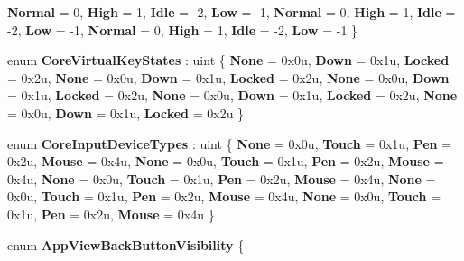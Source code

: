 \begin{DoxyCompactItemize}
\newline
{\bfseries Normal} = 0, 
{\bfseries High} = 1, 
{\bfseries Idle} = -\/2, 
{\bfseries Low} = -\/1, 
\newline
{\bfseries Normal} = 0, 
{\bfseries High} = 1, 
{\bfseries Idle} = -\/2, 
{\bfseries Low} = -\/1, 
\newline
{\bfseries Normal} = 0, 
{\bfseries High} = 1, 
{\bfseries Idle} = -\/2, 
{\bfseries Low} = -\/1
 \}
\item 
\mbox{\label{namespace_windows_1_1_u_i_1_1_core_aa71ac02d1eeaccb86184a016581721ab}} 
enum {\bfseries Core\+Virtual\+Key\+States} \+: uint \{ \newline
{\bfseries None} = 0x0u, 
{\bfseries Down} = 0x1u, 
{\bfseries Locked} = 0x2u, 
{\bfseries None} = 0x0u, 
\newline
{\bfseries Down} = 0x1u, 
{\bfseries Locked} = 0x2u, 
{\bfseries None} = 0x0u, 
{\bfseries Down} = 0x1u, 
\newline
{\bfseries Locked} = 0x2u, 
{\bfseries None} = 0x0u, 
{\bfseries Down} = 0x1u, 
{\bfseries Locked} = 0x2u, 
\newline
{\bfseries None} = 0x0u, 
{\bfseries Down} = 0x1u, 
{\bfseries Locked} = 0x2u
 \}
\item 
\mbox{\label{namespace_windows_1_1_u_i_1_1_core_a77ab8ebe40609e15ad86f2c13a357af6}} 
enum {\bfseries Core\+Input\+Device\+Types} \+: uint \{ \newline
{\bfseries None} = 0x0u, 
{\bfseries Touch} = 0x1u, 
{\bfseries Pen} = 0x2u, 
{\bfseries Mouse} = 0x4u, 
\newline
{\bfseries None} = 0x0u, 
{\bfseries Touch} = 0x1u, 
{\bfseries Pen} = 0x2u, 
{\bfseries Mouse} = 0x4u, 
\newline
{\bfseries None} = 0x0u, 
{\bfseries Touch} = 0x1u, 
{\bfseries Pen} = 0x2u, 
{\bfseries Mouse} = 0x4u, 
\newline
{\bfseries None} = 0x0u, 
{\bfseries Touch} = 0x1u, 
{\bfseries Pen} = 0x2u, 
{\bfseries Mouse} = 0x4u, 
\newline
{\bfseries None} = 0x0u, 
{\bfseries Touch} = 0x1u, 
{\bfseries Pen} = 0x2u, 
{\bfseries Mouse} = 0x4u
 \}
\item 
\mbox{\label{namespace_windows_1_1_u_i_1_1_core_a8126ec99b9eece4bc7dfad594e5fa9a6}} 
enum {\bfseries App\+View\+Back\+Button\+Visibility} \{ \newline

\end{DoxyCompactItemize}
